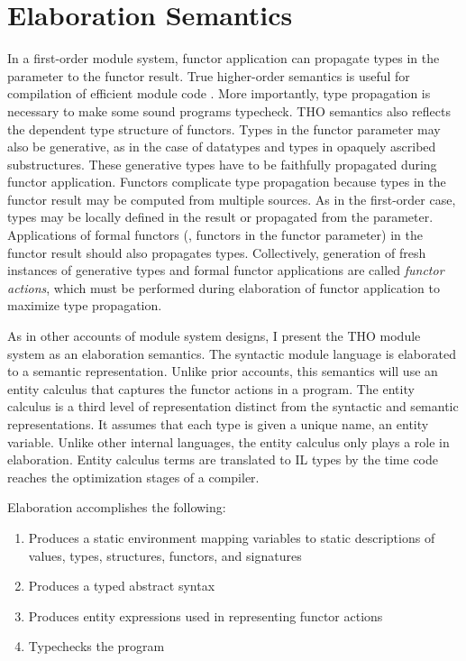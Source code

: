 \documentclass[9pt,nocopyrightspace, fleqn]{sigplanconf}
\begin{document}
\section{Elaboration Semantics}

In a first-order module system, functor application can propagate types in the parameter to the functor result. True higher-order semantics is useful for compilation of efficient module code \cite{shao98}. More importantly, type propagation is necessary to make some sound programs typecheck. THO semantics also reflects the dependent type structure of functors. Types in the functor parameter may also be generative, as in the case of datatypes and types in opaquely ascribed substructures. These generative types have to be faithfully propagated during functor application. Functors complicate type propagation because types in the functor result may be computed from multiple sources. As in the first-order case, types may be locally defined in the result or propagated from the parameter. Applications of formal functors (\ie, functors in the functor parameter) in the functor result should also propagates types. Collectively, generation of fresh instances of generative types and formal functor applications are called \emph{functor actions}, which must be performed during elaboration of functor application to maximize type propagation.    
 
As in other accounts of module system designs, I present the THO module system as an elaboration semantics. The syntactic module language is elaborated to a semantic representation. Unlike prior accounts, this semantics will use an entity calculus that captures the functor actions in a program. The entity calculus is a third level of representation distinct from the syntactic and semantic representations. It assumes that each type is given a unique name, an entity variable. Unlike other internal languages, the entity calculus only plays a role in elaboration. Entity calculus terms are translated to IL types by the time code reaches the optimization stages of a compiler. 
      
Elaboration accomplishes the following:
\begin{enumerate}   
	\item Produces a static environment mapping variables to static descriptions of values, types, structures, functors, and signatures
	\item Produces a typed abstract syntax
	\item Produces entity expressions used in representing functor actions
	\item Typechecks the program
\end{enumerate}
\end{document}
